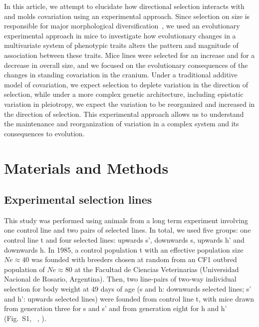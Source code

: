 \begin{refsection}
In this article, we attempt to elucidate how directional selection
interacts with and molds covariation using an experimental approach.
Since selection on size is responsible for major morphological
diversification~\parencite{Baker2015-ti}, we used an evolutionary experimental
approach in mice to investigate how evolutionary changes in a
multivariate system of phenotypic traits alters the pattern and
magnitude of association between these traits. Mice lines were selected
for an increase and for a decrease in overall size, and we focused on
the evolutionary consequences of the changes in standing covariation in
the cranium. Under a traditional additive model of covariation, we
expect selection to deplete variation in the direction of selection,
while under a more complex genetic architecture, including epistatic
variation in pleiotropy, we expect the variation to be reorganized and
increased in the direction of selection. This experimental approach
allows us to understand the maintenance and reorganization of variation
in a complex system and its consequences to evolution.

\section{Materials and Methods}

\subsection{Experimental selection lines}

This study was performed using animals from a long term experiment
involving one control line and two pairs of selected lines. In total, we
used five groups: one control line t and four selected lines: upwards
s', downwards s, upwards h' and downwards h. In 1985, a control
population t with an effective population size \(Ne \approx 40\) was
founded with breeders chosen at random from an CF1 outbred population of
\(Ne \approx 80\) at the Facultad de Ciencias Veterinarias (Universidad
Nacional de Rosario, Argentina). Then, two line-pairs of two-way
individual selection for body weight at 49 days of age (s and h:
downwards selected lines; s' and h': upwards selected lines) were
founded from control line t, with mice drawn from generation three for s
and s' and from generation eight for h and h' (Fig.~S1, ~\textcite{Oyarzabal2011-uk},
\textcite{Renny2014-on}).


\end{refsection}
